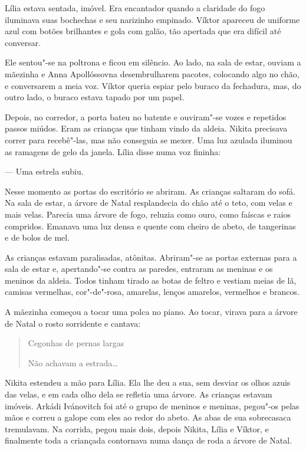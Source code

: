 Lília estava sentada, imóvel. Era encantador quando a claridade do fogo
iluminava suas bochechas e seu narizinho empinado. Víktor apareceu de
uniforme azul com botões brilhantes e gola com galão, tão apertada que
era difícil até conversar.

Ele sentou"-se na poltrona e ficou em silêncio. Ao lado, na sala de
estar, ouviam a mãezinha e Anna Apollóssovna desembrulharem pacotes,
colocando algo no chão, e conversarem a meia voz. Víktor queria espiar
pelo buraco da fechadura, mas, do outro lado, o buraco estava tapado por
um papel.

Depois, no corredor, a porta bateu no batente e ouviram"-se vozes e
repetidos passos miúdos. Eram as crianças que tinham vindo da aldeia.
Nikita precisava correr para recebê"-las, mas não conseguia se mexer. Uma
luz azulada iluminou as ramagens de gelo da janela. Lília disse numa voz
fininha:

--- Uma estrela subiu.

Nesse momento as portas do escritório se abriram. As crianças saltaram
do sofá. Na sala de estar, a árvore de Natal resplandecia do chão até o
teto, com velas e mais velas. Parecia uma árvore de fogo, reluzia como
ouro, como faíscas e raios compridos. Emanava uma luz densa e quente com
cheiro de abeto, de tangerinas e de bolos de mel.

As crianças estavam paralisadas, atônitas. Abriram"-se as portas externas
para a sala de estar e, apertando"-se contra as paredes, entraram as
meninas e os meninos da aldeia. Todos tinham tirado as botas de feltro e
vestiam meias de lã, camisas vermelhas, cor"-de"-rosa, amarelas, lenços
amarelos, vermelhos e brancos.

A mãezinha começou a tocar uma polca no piano. Ao tocar, virava para a
árvore de Natal o rosto sorridente e cantava:


\begin{quotation}
Cegonhas de pernas largas

Não achavam a estrada\ldots{}
\end{quotation}

Nikita estendeu a mão para Lília. Ela lhe deu a sua, sem desviar os
olhos azuis das velas, e em cada olho dela se refletia uma árvore. As
crianças estavam imóveis. Arkádi Ivánovitch foi até o grupo de meninos e
meninas, pegou"-os pelas mãos e correu a galope com eles ao redor do
abeto. As abas de sua sobrecasaca tremulavam. Na corrida, pegou mais
dois, depois Nikita, Lília e Víktor, e finalmente toda a criançada
contornava numa dança de roda a árvore de Natal.

